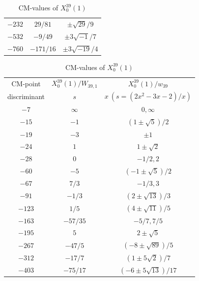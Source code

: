 \documentclass{amsart}
\theoremstyle{definition}
\begin{document}
\begin{appendices}
\begin{table}
\begin{tabular}{|c|c|c|}
${-232}$ & ${29}/{81}$ & $ \pm{\sqrt{29}}/{9}$   \\
${-532}$ & $-{9}/{49}$ & $ \pm{3\sqrt{-1}}/{7}$   \\ 
${-760}$ & $-{171}/{16}$ & $ \pm{3\sqrt{-19}}/{4}$   \\ \hline
\end{tabular}
\bigskip
\caption{CM-values of $X^{38}_0(1)$}

\begin{tabular}{|c|c|c|}
\hline
CM-point& ${X_{0}^{39}(1)/W_{39,1}}$ & ${X_{0}^{39}(1)/w_{39}}$ \\ 
        discriminant  & $s$ & $x\ (s=(2x^2-3x-2)/{x})$ \\ \hline
${-7}$ & $\infty$ & $0,\infty$   \\ 
${-15}$ & $-1$ & $(1\pm\sqrt{5})/{2}$  \\ 
${-19}$ & $-3$ & $\pm 1$  \\ 
${-24}$ & $1$ & $1\pm\sqrt{2}$ \\ 
${-28}$ & $0$ & $-{1}/{2},2$  \\ 
${-60}$ & $-5$ & $(-1\pm\sqrt{5})/2$  \\
${-67}$ & ${7}/{3}$ & $-{1}/{3},3$  \\ 
${-91}$ & $-{1}/{3}$ & $ (2\pm\sqrt{13})/{3}$  \\ 
${-123}$ & ${1}/{5}$ & $ (4\pm\sqrt{11})/{5}$ \\ 
${-163}$ & $-{57}/{35}$ & $ -{5}/{7},{7}/{5}$  \\ 

${-195}$ & $5$ & $ 2\pm \sqrt{5}$ \\ 
${-267}$ & $-{47}/{5}$ & $ (-8\pm\sqrt{89})/{5}$  \\ 
${-312}$ & $-{17}/{7}$ & $(1\pm 5\sqrt{2})/{7}$   \\ 
$-{403}$ & $-{75}/{17}$ & $ (-6\pm5\sqrt{13})/{17}$  \\ \hline















\end{tabular}
\bigskip
\caption{CM-values of $X^{39}_0(1)$}



\end{table}



\end{appendices}
\end{document}
